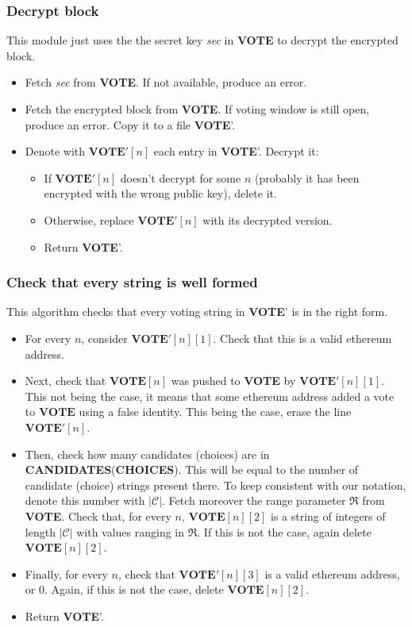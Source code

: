 \documentclass[submission, copyright,creativecommons,sharealike,noncommercial]{eptcs}
\newcommand{\candidates}{\ensuremath{\mathcal{C}} \xspace}
\newcommand{\range}{\ensuremath{\mathfrak{R}}\xspace}
\newcommand{\Candidates}{\textbf{CANDIDATES}\xspace}
\newcommand{\Choices}{\textbf{CHOICES}\xspace}
\newcommand{\Vote}{\textbf{VOTE}\xspace}
\begin{document}
\subsubsection{Decrypt block}\label{subsubsec:Decrypt block}
This module just uses the the secret key \emph{sec} in \Vote to decrypt the encrypted block.
	\begin{itemize}
		\item Fetch \emph{sec} from \Vote. If not available, produce an error.
		\item Fetch the encrypted block from \Vote. If voting window is still open, produce an error. Copy it to a file \Vote'.
		\item Denote with $\Vote'[n]$ each entry in \Vote'. Decrypt it:
		\begin{itemize}
			\item If $\Vote'[n]$ doesn't decrypt for some $n$ (probably it has been encrypted with the wrong public key), delete it.
			\item Otherwise, replace $\Vote'[n]$ with its decrypted version.
			\item Return \Vote'.
		\end{itemize}
	\end{itemize}


\subsubsection{Check that every string is well formed}\label{subsubsec:Check that every string is well formed}
	This algorithm checks that every voting string in \Vote' is in the right form.
	\begin{itemize}
		\item For every $n$, consider $\Vote'[n][1]$. Check that this is a valid ethereum address.
		
		\item Next, check that $\Vote[n]$ was pushed to \Vote by $\Vote'[n][1]$. This not being the case, it means that some ethereum address added a vote to $\Vote$ using a false identity. This being the case, erase the line $\Vote'[n]$. 
		
		\item Then, check how many candidates (choices) are in \Candidates (\Choices). This will be equal to the number of candidate (choice) strings present there. To keep consistent with our notation, denote this number with $|\candidates|$. Fetch moreover the range parameter $\range$ from \Vote. Check that, for every $n$, $\Vote[n][2]$ is a string of integers of length $|\candidates|$ with values ranging in $\range$. If this is not the case, again delete $\Vote[n][2]$.
		
		\item Finally, for every $n$, check that $\Vote'[n][3]$ is a valid ethereum address, or $0$. Again, if this is not the case, delete $\Vote[n][2]$.
		
		\item Return \Vote'.
	\end{itemize}
	
\end{document}

